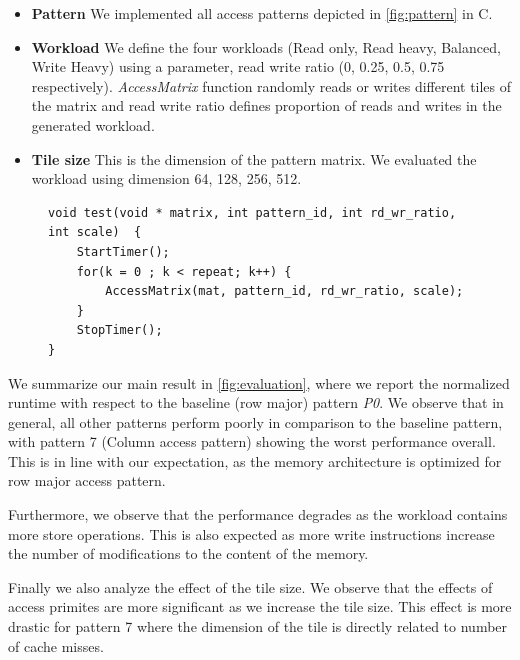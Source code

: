 \documentclass[letterpaper]{article}
\begin{document}
\begin{itemize}
  \item \textbf{Pattern} We implemented all access patterns depicted in \ref{fig:pattern} in C.
  \item \textbf{Workload} We define the four workloads (Read only, Read heavy,
Balanced, Write Heavy) using a parameter, read write ratio (0, 0.25, 0.5, 0.75 respectively).
\textit{AccessMatrix} function randomly reads or writes different tiles of the matrix and read
write ratio defines proportion of reads and writes in the generated workload.
  \item \textbf{Tile size} This is the dimension of the pattern matrix. We evaluated the
  workload using dimension 64, 128, 256, 512.
\end{itemize}

\begin{figure}
\begin{Verbatim}[fontsize=\small]
void test(void * matrix, int pattern_id, int rd_wr_ratio, int scale)  {
    StartTimer();
    for(k = 0 ; k < repeat; k++) {
        AccessMatrix(mat, pattern_id, rd_wr_ratio, scale);
    }
    StopTimer();
}
\end{Verbatim}

\label{fig:testcode}
\end{figure}

We summarize our main result in \ref{fig:evaluation}, where we report the normalized runtime
with respect to the baseline (row major) pattern \textit{P0}. We observe that in general, all other patterns
perform poorly in comparison to the baseline pattern, with pattern 7 (Column access pattern) showing
the worst performance overall. This is in line with our expectation, as the memory architecture is optimized
for row major access pattern.

Furthermore, we observe that the performance degrades as the workload contains more store operations. This is
also expected as more write instructions increase the number of modifications to the content of the memory.

Finally we also analyze the effect of the tile size. We observe that the effects of access primites are more
significant as we increase the tile size. This effect is more drastic for pattern 7 where the dimension of the
tile is directly related to number of cache misses.
\end{document}

